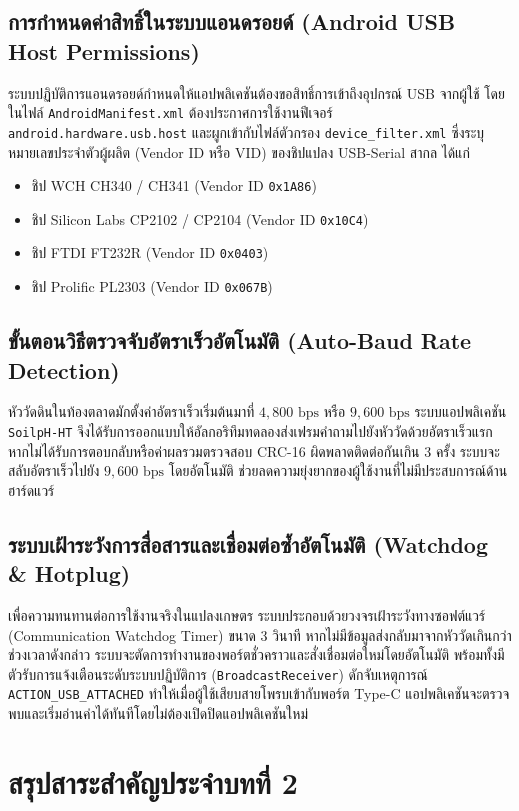 \subsection{การกำหนดค่าสิทธิ์ในระบบแอนดรอยด์ (Android USB Host Permissions)}
ระบบปฏิบัติการแอนดรอยด์กำหนดให้แอปพลิเคชันต้องขอสิทธิ์การเข้าถึงอุปกรณ์ USB จากผู้ใช้ โดยในไฟล์ \texttt{AndroidManifest.xml} ต้องประกาศการใช้งานฟีเจอร์ \texttt{android.hardware.usb.host} และผูกเข้ากับไฟล์ตัวกรอง \texttt{device\_filter.xml} ซึ่งระบุหมายเลขประจำตัวผู้ผลิต (Vendor ID หรือ VID) ของชิปแปลง USB-Serial สากล ได้แก่
\begin{itemize}
    \item ชิป WCH CH340 / CH341 (Vendor ID \texttt{0x1A86})
    \item ชิป Silicon Labs CP2102 / CP2104 (Vendor ID \texttt{0x10C4})
    \item ชิป FTDI FT232R (Vendor ID \texttt{0x0403})
    \item ชิป Prolific PL2303 (Vendor ID \texttt{0x067B})
\end{itemize}

\subsection{ขั้นตอนวิธีตรวจจับอัตราเร็วอัตโนมัติ (Auto-Baud Rate Detection)}
หัววัดดินในท้องตลาดมักตั้งค่าอัตราเร็วเริ่มต้นมาที่ $4,800\text{ bps}$ หรือ $9,600\text{ bps}$ ระบบแอปพลิเคชัน \texttt{SoilpH-HT} จึงได้รับการออกแบบให้อัลกอริทึมทดลองส่งเฟรมคำถามไปยังหัววัดด้วยอัตราเร็วแรก หากไม่ได้รับการตอบกลับหรือค่าผลรวมตรวจสอบ CRC-16 ผิดพลาดติดต่อกันเกิน 3 ครั้ง ระบบจะสลับอัตราเร็วไปยัง $9,600\text{ bps}$ โดยอัตโนมัติ ช่วยลดความยุ่งยากของผู้ใช้งานที่ไม่มีประสบการณ์ด้านฮาร์ดแวร์

\subsection{ระบบเฝ้าระวังการสื่อสารและเชื่อมต่อซ้ำอัตโนมัติ (Watchdog \& Hotplug)}
เพื่อความทนทานต่อการใช้งานจริงในแปลงเกษตร ระบบประกอบด้วยวงจรเฝ้าระวังทางซอฟต์แวร์ (Communication Watchdog Timer) ขนาด 3 วินาที หากไม่มีข้อมูลส่งกลับมาจากหัววัดเกินกว่าช่วงเวลาดังกล่าว ระบบจะตัดการทำงานของพอร์ตชั่วคราวและสั่งเชื่อมต่อใหม่โดยอัตโนมัติ พร้อมทั้งมีตัวรับการแจ้งเตือนระดับระบบปฏิบัติการ (\texttt{BroadcastReceiver}) ดักจับเหตุการณ์ \texttt{ACTION\_USB\_ATTACHED} ทำให้เมื่อผู้ใช้เสียบสายโพรบเข้ากับพอร์ต Type-C แอปพลิเคชันจะตรวจพบและเริ่มอ่านค่าได้ทันทีโดยไม่ต้องเปิดปิดแอปพลิเคชันใหม่

\section{สรุปสาระสำคัญประจำบทที่ 2}

